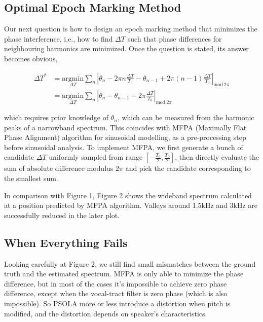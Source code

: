 \documentclass{article}
\begin{document}
\subsection{Optimal Epoch Marking Method}

Our next question is how to design an epoch marking method that minimizes the phase interference, i.e., how to find $\Delta T$ such that phase differences for neighbouring harmonics are minimized. Once the question is stated, its answer becomes obvious,

\begin{align}
\Delta T^* &= \underset{\Delta T}{\mathrm{argmin}} \sum_n \left| \theta_n - 2\pi n \frac{\Delta T}{T_0} - \theta_{n - 1} + 2\pi (n - 1) \frac{\Delta T}{T_0} \right|_{\mathrm{mod}\ 2\pi} \\
 &= \underset{\Delta T}{\mathrm{argmin}} \sum_n \left| \theta_n - \theta_{n - 1} - 2\pi \frac{\Delta T}{T_0} \right|_{\mathrm{mod}\ 2\pi}
\end{align}

which requires prior knowledge of $\theta_n$, which can be measured from the harmonic peaks of a narrowband spectrum. This coincides with MFPA (Maximally Flat Phase Alignment) algorithm\cite{bonada} for sinusoidal modelling, as a pre-processing step before sinusoidal analysis. To implement MFPA, we first generate a bunch of candidate $\Delta T$ uniformly sampled from range $[-\frac{T_0}{2}, \frac{T_0}{2}]$, then directly evaluate the sum of absolute difference modulus $2\pi$ and pick the candidate corresponding to the smallest sum.

In comparison with Figure 1, Figure 2 shows the wideband spectrum calculated at a position predicted by MFPA algorithm. Valleys around 1.5kHz and 3kHz are successfully reduced in the later plot.

\begin{figure}[H]
\centering
\scalebox{.65}{}
\caption{}
\label{fig:psola-wb-mfpa}
\end{figure}

\subsection{When Everything Fails}

Looking carefully at Figure 2, we still find small mismatches between the ground truth and the estimated spectrum. MFPA is only able to minimize the phase difference, but in most of the cases it's impossible to achieve zero phase difference, except when the vocal-tract filter is zero phase (which is also impossible). So PSOLA more or less introduce a distortion when pitch is modified, and the distortion depends on speaker's characteristics.
\end{document}
